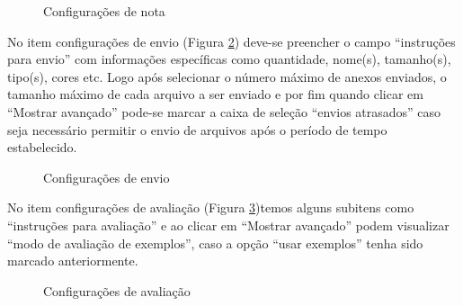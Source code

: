  \begin{figure}
 \begin{center}
  \caption{Configurações de nota}
  \label{fig:config_nota}
 \end{center}
\end{figure}

No item configurações de envio (Figura \ref{fig:config_envio}) deve-se preencher o campo “instruções para envio” com informações específicas como quantidade, nome(s), tamanho(s), tipo(s), cores etc. Logo após selecionar o número máximo de anexos enviados, o tamanho máximo de cada arquivo a ser enviado e por fim quando clicar em “Mostrar avançado” pode-se marcar a caixa de seleção “envios atrasados” caso seja necessário permitir o envio de arquivos após o período de tempo estabelecido.

 \begin{figure}
 \begin{center}
  \caption{Configurações de envio}
  \label{fig:config_envio}
 \end{center}
\end{figure}

No item configurações de avaliação (Figura \ref{fig:config_ava})temos alguns subitens como “instruções para avaliação” e ao clicar em “Mostrar avançado” podem visualizar “modo de avaliação de exemplos”, caso a opção “usar exemplos” tenha sido marcado anteriormente.

 \begin{figure}
 \begin{center}
  \caption{Configurações de avaliação}
  \label{fig:config_ava}
 \end{center}
\end{figure}

